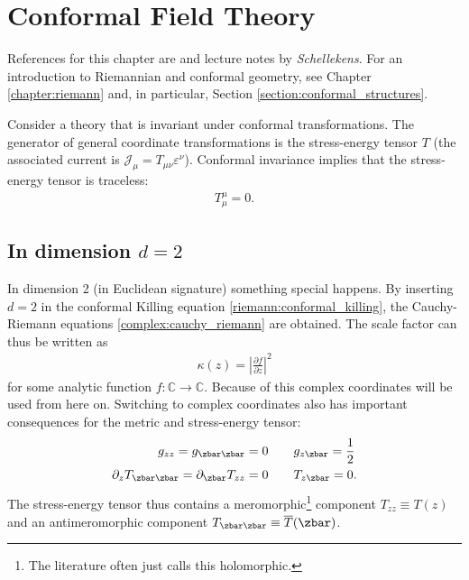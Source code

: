 \chapter{Conformal Field Theory}\label{chapter:cft}

    References for this chapter are \cite{CFT} and lecture notes by \textit{Schellekens}. For an introduction to Riemannian and conformal geometry, see Chapter \ref{chapter:riemann} and, in particular, Section \ref{section:conformal_structures}.

    \begin{property}
        Consider a theory that is invariant under conformal transformations. The generator of general coordinate transformations is the stress-energy tensor $T$ (the associated current is $\mathcal{J}_\mu = T_{\mu\nu}\varepsilon^\nu$). Conformal invariance implies that the stress-energy tensor is traceless:
        \begin{gather}
            T^\mu_\mu = 0.
        \end{gather}
    \end{property}

\section{\texorpdfstring{In dimension $d=2$}{In dimension d=2}}

    In dimension 2 (in Euclidean signature) something special happens. By inserting $d=2$ in the conformal Killing equation \eqref{riemann:conformal_killing}, the Cauchy-Riemann equations \ref{complex:cauchy_riemann} are obtained. The scale factor can thus be written as
    \begin{gather}
        \kappa(z) = \left|\frac{\partial f}{\partial z}\right|^2
    \end{gather}
    for some analytic function $f:\mathbb{C}\rightarrow\mathbb{C}$. Because of this complex coordinates will be used from here on. Switching to complex coordinates also has important consequences for the metric and stress-energy tensor:
    \begin{align}
        g_{zz} = g_{\zbar\zbar} = 0&\qquad g_{z\zbar} = \frac{1}{2}\\
        \partial_zT_{\zbar\zbar} = \partial_{\zbar} T_{zz} = 0&\qquad T_{z\zbar} = 0.
    \end{align}
    The stress-energy tensor thus contains a meromorphic\footnote{The literature often just calls this holomorphic.} component $T_{zz}\equiv T(z)$ and an antimeromorphic component $T_{\zbar\zbar}\equiv\overline{T}(\zbar)$.

